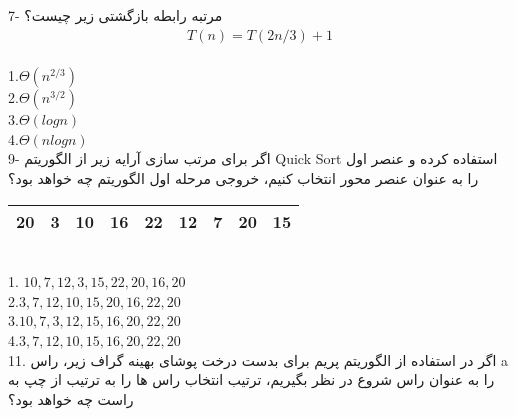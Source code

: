 \documentclass{book}
\begin{document}
7- مرتبه رابطه بازگشتی زیر چیست؟\\
\begin{align*} T(n)=T(2n/3) +1 \end{align*} \\
1.$\Theta(n^{2/3})$\\
2.$\Theta(n^{3/2})$\\
3.$\Theta(log n)$\\
4.$\Theta(n log n)$\\

9- اگر برای مرتب سازی آرایه زیر از الگوریتم Quick Sort  استفاده کرده و عنصر اول را به عنوان عنصر محور انتخاب کنیم، خروجی مرحله اول الگوریتم چه خواهد بود؟\\
\begin{table}[htp]
\renewcommand{\arraystretch}{1.5}
\begin{tabular}{|c|c|c|c|c|c|c|c|c|}
\hline
20 & 3 & 10 & 16 & 22 & 12 & 7 & 20 & 15 \\ \hline
\end{tabular}
\end{table}
\\
1. $10 ,7,12,3,15,22,20,16,20$ \\
2.$3,7,12,10,15,20,16,22,20$ \\
3.$10,7,3,12,15,16,20,22,20 $\\
4.$3,7,12,10,15,16,20,22,20$ \\

11. اگر در استفاده از الگوریتم پریم برای بدست درخت پوشای بهینه گراف زیر، راس a را به عنوان راس شروع در نظر بگیریم، ترتیب انتخاب راس ها را به ترتیب از چپ به راست چه خواهد بود؟\\
\\
  
\end{document}
